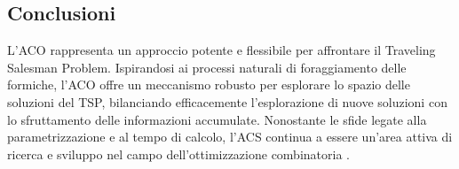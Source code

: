 \subsection{Conclusioni}

L'\gls{ACO} rappresenta un approccio potente e flessibile per affrontare il Traveling Salesman Problem. Ispirandosi ai processi naturali di foraggiamento delle formiche, l'\gls{ACO} offre un meccanismo robusto per esplorare lo spazio delle soluzioni del \gls{TSP}, bilanciando efficacemente l'esplorazione di nuove soluzioni con lo sfruttamento delle informazioni accumulate. Nonostante le sfide legate alla parametrizzazione e al tempo di calcolo, l'\gls{ACS} continua a essere un'area attiva di ricerca e sviluppo nel campo dell'ottimizzazione combinatoria \cite{dorigo2010ant}.
